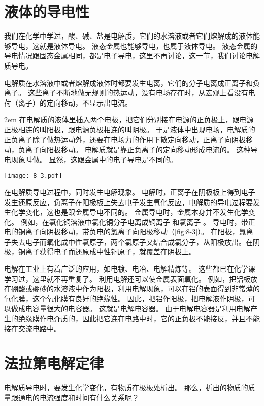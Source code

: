 \section{液体的导电性}
我们在化学中学过，酸、碱、盐是电解质，它们的水溶液或者它们熔解成的液体能够导电，这就是液体导电。
液态金属也能够导电，也属于液体导电。
液态金属的导电情况跟固态金属相同，都是电子导电，这里不再讨论，这一节，我们讨论电解质导电。

电解质在水溶液中或者熔解成液体时都要发生电离，它们的分子电离成正离子和负离子。
这些离子不断地做无规则的热运动，没有电场存在时，从宏观上看没有电荷（离子）的定向移动，不显示出电流。

\medskip\noindent
\begin{minipage}{0.5\linewidth}\parindent2em
在电解质的液体里插入两个电极，把它们分别接在电源的正负极上，跟电源正极相连的叫阳极，跟电源负极相连的叫阴极。
于是液体中出现电场，电解质的正负离子除了做热运动外，还要在电场力的作用下散定向移动，正离子向阴极移动，负离子向阳极移动。
电解质就是靠正负离子的定向移动形成电流的。
这种导电现象叫做。
显然，这跟金属中的电子导电是不同的。
\end{minipage}\hfill
\begin{minipage}{0.45\linewidth}\centering
  \begin{figurehere}
    \texttt{[image: 8-3.pdf]}
    \caption{}\label{fig:8-3}
  \end{figurehere}
\end{minipage}

\medskip
在电解质导电过程中，同时发生电解现象。
电解时，正离子在阴极板上得到电子发生还原反应，负离子在阳极板上失去电子发生氧化反应，电解质的导电过程要发生化学变化，这也是跟金属导电不同的。
金属导电时，金属本身并不发生化学变化。
例如，在氯化铜溶液中氯化铜分子电离成铜离子  和氯离子 。
导电时，带正电的铜离子向阴极移动，带负电的氯离子向阳极移动（\cref{fig:8-3}）。
在阳极，氯离子失去电子而氧化成中性氯原子，两个氯原子又结合成氯分子，从阳极放出。在阴极，铜离子获得电子而还原成中性铜原子，就覆盖在阴极上。

电解在工业上有着广泛的应用，如电镀、电冶、电解精炼等。
这些都已在化学课学习过，这里就不再重复了。
利用电解还可以使金属表面氧化。
例如，把铝板放在硼酸或硼砂的水溶液中作为阳极，利用电解现象，可以在铝的表面得到非常薄的氧化膜，这个氧化膜有良好的绝缘性。
因此，把铝作阳极，把电解液作阴极，可以做成电容量很大的电容器。
这就是电解电容器。
由于电解电容器是利用电解产生的绝缘膜作电介质的，因此把它连在电路中时，它的正负极不能接反，并且不能接在交流电路中。

\section{法拉第电解定律}
电解质导电时，要发生化学变化，有物质在极板处析出。
那么，析出的物质的质量跟通电的电流强度和时间有什么关系呢？

